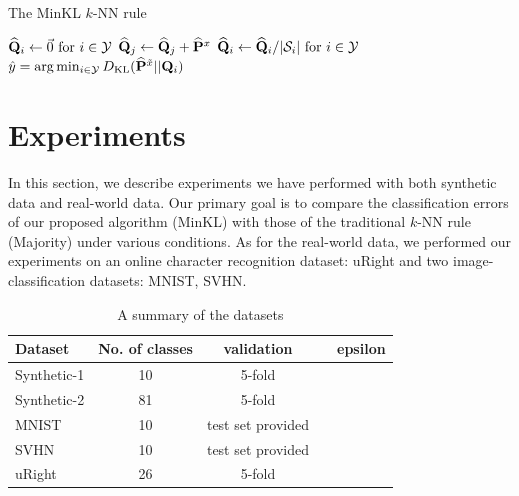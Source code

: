 \documentclass{article}
\begin{document}
\begin{algorithm}
\caption{The MinKL $k$-NN rule}
\label{alg:minkl}
\begin{algorithmic}[1]
\STATE $\widehat{\mathbf{Q}}_i \leftarrow \vec{0} \mbox{ for } i \in \mathcal{Y}$
\STATE $\widehat{\mathbf{Q}}_j \leftarrow \widehat{\mathbf{Q}}_j + \widehat{\mathbf{P}}^x$
\ENDFOR
\STATE $\widehat{\mathbf{Q}}_i \leftarrow \widehat{\mathbf{Q}}_i / |\mathcal{S}_i| \mbox{ for } i \in \mathcal{Y}$
\STATE $\hat{y} = \arg\min_{i \in \mathcal{Y}} D_{\mathrm{KL}}(\widehat{\mathbf{P}}^{\tilde{x}} || \mathbf{Q}_i)$
\end{algorithmic}
\end{algorithm}

\section{Experiments}

In this section, we describe experiments we have performed with both
synthetic data and real-world data. Our primary goal is to compare the
classification errors of our proposed algorithm (MinKL) with those of
the traditional $k$-NN rule (Majority) under various conditions.  As
for the real-world data, we performed our experiments on an online
character recognition dataset: uRight and two image-classification
datasets: MNIST, SVHN.

\begin{table}[t]
\caption{A summary of the datasets}
\label{table:datasets}
\vskip 0.15in
\begin{center}
\begin{small}
\begin{sc}
\begin{tabular}{lcccr}
\hline
\abovespace\belowspace
Dataset & No. of classes & validation && epsilon\\
\hline
\abovespace
Synthetic-1   & 10 & 5-fold && \\
Synthetic-2 & 81 & 5-fold && \\
\belowspace
MNIST & 10 & test set provided && \\
SVHN & 10 & test set provided && \\
uRight & 26 & 5-fold && \\
\hline
\end{tabular}
\end{sc}
\end{small}
\end{center}
\vskip -0.1in
\end{table}
\end{document}
